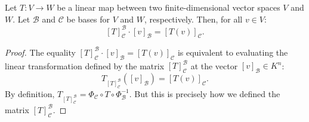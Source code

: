 \begin{proposition}
\label{prop:matrix_evaluation}
Let $T: V \to W$ be a linear map between two finite-di\-men\-sional vector spaces $V$ and $W$. Let $\mathcal{B}$ and $\mathcal{C}$ be bases for $V$ and $W$, respectively. Then, for all $v \in V$:
\[
[T]_{\mathcal{C}}^{\mathcal{B}} \cdot [v]_{\mathcal{B}} = [T(v)]_{\mathcal{C}}.
\]
\end{proposition}

\begin{proof}
The equality $[T]_{\mathcal{C}}^{\mathcal{B}} \cdot [v]_{\mathcal{B}} = [T(v)]_{\mathcal{C}}$ is equivalent to evaluating the linear transformation defined by the matrix $[T]_{\mathcal{C}}^{\mathcal{B}}$ at the vector $[v]_{\mathcal{B}} \in K^n$:
\[
T_{[T]_{\mathcal{C}}^{\mathcal{B}}}([v]_{\mathcal{B}}) = [T(v)]_{\mathcal{C}}.
\]
By definition, $T_{[T]_{\mathcal{C}}^{\mathcal{B}}} = \Phi_{\mathcal{C}} \circ T \circ \Phi_{\mathcal{B}}^{-1}$. But this is precisely how we defined the matrix $[T]_{\mathcal{C}}^{\mathcal{B}}$.
\end{proof}

